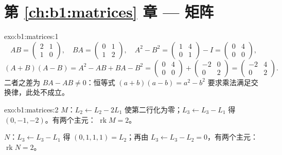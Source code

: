\section*{第 \ref{ch:b1:matrices} 章 --- 矩阵}

\begin{solution}{exo:b1:matrices:1}
\[
AB = \begin{pmatrix} 2 & 1\\ 1 & 0\end{pmatrix},
\quad
BA = \begin{pmatrix} 0 & 1\\ 1 & 2\end{pmatrix},
\quad
A^2 - B^2 = \begin{pmatrix} 1 & 4\\ 0 & 1\end{pmatrix} - I
= \begin{pmatrix} 0 & 4\\ 0 & 0\end{pmatrix},
\]
\[
(A+B)(A-B) = A^2 - AB + BA - B^2
= \begin{pmatrix} 0 & 4\\ 0 & 0\end{pmatrix} +
\begin{pmatrix} -2 & 0\\ 0 & 2 \end{pmatrix}
= \begin{pmatrix} -2 & 4\\ 0 & 2\end{pmatrix}.
\]
二者之差为 $BA - AB \neq 0$：恒等式 $(a+b)(a-b) = a^2 -
b^2$ 要求乘法满足交换律，此处不成立。
\end{solution}

\begin{solution}{exo:b1:matrices:2}
$M$：$L_2 \leftarrow L_2 - 2L_1$ 使第二行化为零；$L_3
\leftarrow L_3 - L_1$ 得 $(0, -1, -2)$。有两个主元：
$\operatorname{rk} M = 2$。

$N$：$L_3 \leftarrow L_3 - L_1$ 得 $(0,1,1,1) = L_2$；再由 $L_3
\leftarrow L_3 - L_2 = 0$，有两个主元：$\operatorname{rk} N = 2$。
\end{solution}

